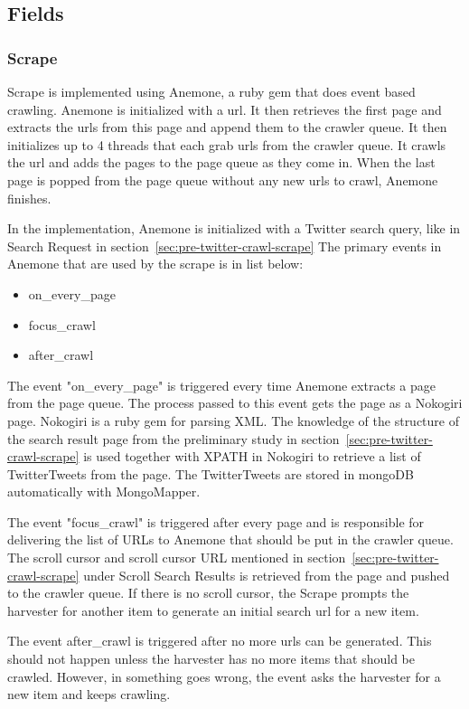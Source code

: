 \subsection{Fields}
\subsubsection{Scrape}
Scrape is implemented using Anemone, a ruby gem that does event based crawling. Anemone is initialized with a url. It then retrieves the first page and extracts the urls from this page and append them to the crawler queue. It then initializes up to 4 threads that each grab urls from the crawler queue. It crawls the url and adds the pages to the page queue as they come in. When the last page is popped from the page queue without any new urls to crawl, Anemone finishes.

In the implementation, Anemone is initialized with a Twitter search query, like in Search Request in section~\ref{sec:pre-twitter-crawl-scrape}
The primary events in Anemone that are used by the scrape is in list below:

	\begin{itemize}
	\item on\_every\_page
	\item focus\_crawl
	\item after\_crawl
	\end{itemize}

The event "on\_every\_page" is triggered every time Anemone extracts a page from the page queue. The process passed to this event gets the page as a Nokogiri page. Nokogiri is a ruby gem for parsing XML. The knowledge of the structure of the search result page from the preliminary study in section~\ref{sec:pre-twitter-crawl-scrape} is used together with XPATH in Nokogiri to retrieve a list of TwitterTweets from the page. The TwitterTweets are stored in mongoDB automatically with MongoMapper.

The event "focus\_crawl" is triggered after every page and is responsible for delivering the list of URLs to Anemone that should be put in the crawler queue. The scroll cursor and scroll cursor URL mentioned in section~\ref{sec:pre-twitter-crawl-scrape} under Scroll Search Results is retrieved from the page and pushed to the crawler queue. If there is no scroll cursor, the Scrape prompts the harvester for another item to generate an initial search url for a new item.

The event after\_crawl is triggered after no more urls can be generated. This should not happen unless the harvester has no more items that should be crawled. However, in something goes wrong, the event asks the harvester for a new item and keeps crawling.

